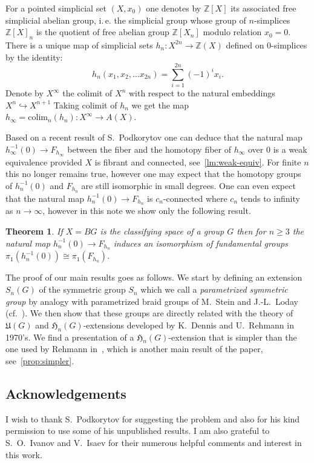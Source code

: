 \documentclass[oneside, 12pt]{amsart}
\theoremstyle{plain}
\newtheorem{thm}{Theorem}
\numberwithin{equation}{section}
\numberwithin{lemma}{section}
\theoremstyle{remark}
\theoremstyle{definition}
\newcommand{\ZZ}{\mathbb{Z}}
\begin{document}
For a pointed simplicial set $(X, x_0)$ one denotes by $\ZZ[X]$ its associated free simplicial abelian group,
 i.\,e. the simplicial group whose group of $n$-simplices $\ZZ[X]_n$ is the quotient of free abelian group $\ZZ[X_n]$ modulo relation $x_0=0$.
There is a unique map of simplicial sets $h_n\colon X^{2n} \to \ZZ(X)$ defined on $0$-simplices by the identity:
 \[h_n(x_1, x_2, \ldots x_{2n}) = \sum\limits_{i=1}^{2n}(-1)^ix_i.\]
Denote by $X^\infty$ the colimit of $X^n$ with respect to the natural embeddings $X^{n} \hookrightarrow X^{n+1}$
Taking colimit of $h_n$ we get the map $h_\infty = \mathrm{colim}_n(h_n) \colon X^\infty \to A(X)$.

Based on a recent result of S.~Podkorytov one can deduce that the natural map $h^{-1}_\infty(0) \to F_{h_\infty}$
 between the fiber and the homotopy fiber of $h_\infty$ over $0$ is a weak equivalence provided $X$ is fibrant and connected, see~\cref{lm:weak-equiv}.
For finite $n$ this no longer remains true, however one may expect that the homotopy groups of $h^{-1}_n(0)$ and $F_{h_n}$ are still
 isomorphic in small degrees. %
One can even expect that the natural map $h^{-1}_n(0) \to F_{h_n}$ is $c_n$-connected where $c_n$ tends to infinity as $n\to \infty$,
 however in this note we show only the following result.
\begin{thm} \label{thm:main} If $X=BG$ is the classifying space of a group $G$ then for $n\geq 3$ the natural map $h_n^{-1}(0) \to F_{h_n}$ induces an isomorphism of fundamental groups
$\pi_1(h^{-1}_n(0))\cong \pi_1(F_{h_n})$. \end{thm}

The proof of our main results goes as follows. 
We start by defining an extension $S_n(G)$ of the symmetric group $S_n$ which we call a {\it parametrized symmetric group} by analogy
 with parametrized braid groups of M.~Stein and J.-L.~Loday (cf.~\cite{LS05}).
We then show that these groups are directly related with the theory of $\mathfrak{U}(G)$ and $\mathfrak{H}_n(G)$-extensions developed by K.~Dennis and U.~Rehmann in 1970's.
We find a presentation of a $\mathfrak{H}_n(G)$-extension that is simpler than the one used by Rehmann in~\cite{Reh78}, 
 which is another main result of the paper, see~\cref{prop:simpler}.

\subsection{Acknowledgements}
I wish to thank S.~Podkorytov for suggesting the problem and also for his kind permission to use some of his unpublished results.
I am also grateful to S.~O.~Ivanov and V.~Isaev for their numerous helpful comments and interest in this work.
\end{document}
